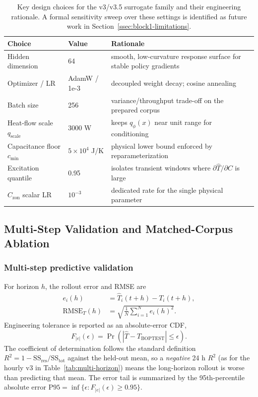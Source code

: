 \documentclass[11pt,a4paper]{article}
\newcommand{\RMSE}{\ensuremath{\mathrm{RMSE}}}
\newcommand{\Czon}{\ensuremath{C_{\mathrm{zon}}}}
\newcommand{\That}{\ensuremath{\widehat{T}}}
\begin{document}
\begin{table}[H]
\centering
\small
\caption{Key design choices for the v3/v3.5 surrogate family and their engineering rationale. A formal sensitivity sweep over these settings is identified as future work in Section~\ref{ssec:block1-limitations}.}
\label{tab:design-rationale}
\begin{tabularx}{\linewidth}{llX}
\toprule
Choice & Value & Rationale \\
\midrule
Hidden dimension & 64 & smooth, low-curvature response surface for stable policy gradients \\
Optimizer / LR & AdamW / 1e-3 & decoupled weight decay; cosine annealing \\
Batch size & 256 & variance/throughput trade-off on the prepared corpus \\
Heat-flow scale $q_{\mathrm{scale}}$ & $3000$ W & keeps $q_\phi(x)$ near unit range for conditioning \\
Capacitance floor $c_{\min}$ & $5\times10^4$ J/K & physical lower bound enforced by reparameterization \\
Excitation quantile & 0.95 & isolates transient windows where $\partial \widehat{T}/\partial C$ is large \\
$\Czon$ scalar LR & $10^{-3}$ & dedicated rate for the single physical parameter \\
\bottomrule
\end{tabularx}
\end{table}

\subsection{Multi-Step Validation and Matched-Corpus Ablation}
\label{ssec:block1-predictive-diagnostics}

\subsubsection{Multi-step predictive validation}

For horizon \(h\), the rollout error and RMSE are
\begin{align}
  e_i(h) &= \That_i(t+h)-T_i(t+h),\\
  \RMSE_T(h) &= \sqrt{\frac{1}{N}\sum_{i=1}^N e_i(h)^2}.
\end{align}
Engineering tolerance is reported as an absolute-error CDF,
\begin{equation}
  F_{|e|}(\epsilon)=\Pr(|\That-T_{\mathrm{BOPTEST}}|\leq \epsilon).
\end{equation}
The coefficient of determination follows the standard definition \(R^2 = 1 - \mathrm{SS}_{\mathrm{res}}/\mathrm{SS}_{\mathrm{tot}}\) against the held-out mean, so a \emph{negative} 24 h \(R^2\) (as for the hourly v3 in Table~\ref{tab:multi-horizon}) means the long-horizon rollout is worse than predicting that mean. The error tail is summarized by the 95th-percentile absolute error \(\mathrm{P95}=\inf\{\epsilon:F_{|e|}(\epsilon)\ge 0.95\}\).
\end{document}
